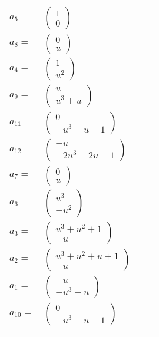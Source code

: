 \documentclass[1p]{elsarticle_modified}
\theoremstyle{definition}
\begin{document}
\begin{tabular}{m{7pt} m{180pt} m{7pt} m{180pt} }
\flushright $a_{5}=$&$\begin{pmatrix}1\\0\end{pmatrix}$ \\
\flushright $a_{8}=$&$\begin{pmatrix}0\\u\end{pmatrix}$ \\
\flushright $a_{4}=$&$\begin{pmatrix}1\\u^2\end{pmatrix}$ \\
\flushright $a_{9}=$&$\begin{pmatrix}u\\u^3+u\end{pmatrix}$ \\
\flushright $a_{11}=$&$\begin{pmatrix}0\\- u^3- u-1\end{pmatrix}$ \\
\flushright $a_{12}=$&$\begin{pmatrix}- u\\-2 u^3-2 u-1\end{pmatrix}$ \\
\flushright $a_{7}=$&$\begin{pmatrix}0\\u\end{pmatrix}$ \\
\flushright $a_{6}=$&$\begin{pmatrix}u^3\\- u^2\end{pmatrix}$ \\
\flushright $a_{3}=$&$\begin{pmatrix}u^3+u^2+1\\- u\end{pmatrix}$ \\
\flushright $a_{2}=$&$\begin{pmatrix}u^3+u^2+u+1\\- u\end{pmatrix}$ \\
\flushright $a_{1}=$&$\begin{pmatrix}- u\\- u^3- u\end{pmatrix}$ \\
\flushright $a_{10}=$&$\begin{pmatrix}0\\- u^3- u-1\end{pmatrix}$\\&\end{tabular}
\end{document}
